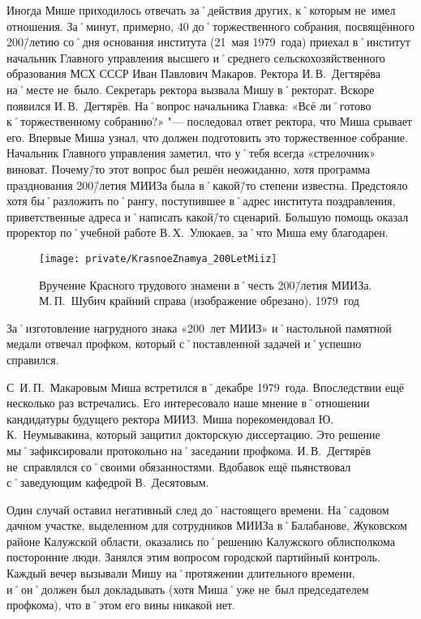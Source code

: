Иногда Мише приходилось отвечать за˚действия других, к˚которым не~имел отношения. За˚минут, примерно, 40 до˚торжественного собрания, посвящённого 200\=/летию со˚дня основания института (21~мая 1979~года) приехал в˚институт начальник Главного управления высшего и˚среднего сельскохозяйственного образования МСХ СССР Иван Павлович Макаров. Ректора И.\,В.~Дегтярёва на˚месте не~было. Секретарь ректора вызвала Мишу в˚ректорат. Вскоре появился И.\,В.~Дегтярёв. На˚вопрос начальника Главка: «Всё ли˚готово к˚торжественному собранию?» "--- последовал ответ ректора, что Миша срывает его. Впервые Миша узнал, что должен подготовить это торжественное собрание. Начальник Главного управления заметил, что у˚тебя всегда «стрелочник» виноват. Почему\=/то этот вопрос был решён неожиданно, хотя программа празднования 200\=/летия МИИЗа была в˚какой\=/то степени известна. Предстояло хотя бы˚разложить по˚рангу, поступившее в˚адрес института поздравления, приветственные адреса и˚написать какой\=/то сценарий. Большую помощь оказал проректор по˚учебной работе В.\,Х.~Улюкаев, за˚что Миша ему благодарен.

\begin{figure}[h]
\texttt{[image: private/KrasnoeZnamya\_200LetMiiz]}
\caption{Вручение Красного трудового знамени в˚честь 200\=/летия МИИЗа. М.\,П.~Шубич крайний справа (изображение обрезано). 1979~год}
\label{fig:KrasnoeZnamya_200LetMiiz}
\end{figure}

За˚изготовление нагрудного знака «200~лет МИИЗ» и˚настольной памятной медали отвечал профком, который с˚поставленной задачей и˚успешно справился.

С~И.\,П.~Макаровым Миша встретился в˚декабре 1979~года. Впоследствии ещё несколько раз встречались. Его интересовало наше мнение в˚отношении кандидатуры будущего ректора МИИЗ. Миша порекомендовал Ю.\,К.~Неумывакина, который защитил докторскую диссертацию. Это решение мы˚зафиксировали протокольно на˚заседании профкома. И.\,В.~Дегтярёв не~справлялся со˚своими обязанностями. Вдобавок ещё пьянствовал с˚заведующим кафедрой В.~Десятовым.

Один случай оставил негативный след до˚настоящего времени. На˚садовом дачном участке, выделенном для сотрудников МИИЗа в˚Балабанове, Жуковском районе Калужской области, оказались по˚решению Калужского облисполкома посторонние люди. Занялся этим вопросом городской партийный контроль. Каждый вечер вызывали Мишу на˚протяжении длительного времени, и˚он˚должен был докладывать (хотя Миша˚уже не~был председателем профкома), что в˚этом его вины никакой нет.

